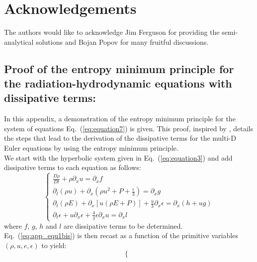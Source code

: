 \documentclass[review]{elsarticle}
\newcommand{\eqt}[1]{Eq.~(\ref{#1})}                     %
\begin{document}
\section*{Acknowledgements}
The authors would like to acknowledge Jim Ferguson for providing the semi-analytical solutions and Bojan Popov for many fruitful discussions. 
\newpage
\begin{appendices}
\section{Proof of the entropy minimum principle for the radiation-hydrodynamic equations with dissipative terms:}
\label{app:appendixA}
In this appendix, a demonstration of the entropy minimum principle for the system of equations \eqt{eq:equation7} is given. This proof, inspired by \cite{jlg}, details the steps that lead to the derivation of the dissipative terms for the multi-D Euler equations by using the entropy minimum principle.\\
We start with the hyperbolic system given in \eqt{eq:equation3} and add dissipative terms to each equation as follows:
\begin{equation}
\label{eq:app_equ1bis}
\left\{
\begin{array}{llll}
\frac{D \rho}{Dt} + \rho \partial_x u = \partial_x f \\
\partial_t (\rho u) + \partial_x \left(\rho u^2 +  P + \frac{\epsilon}{3} \right) = \partial_x g  \\
\partial_t (\rho E) + \partial_x \left[ u \left( \rho E +P \right) \right] + \frac{u}{3} \partial_x \epsilon = \partial_x \left( h + ug \right) \\
\partial_t \epsilon + u \partial_x \epsilon + \frac{4}{3} \epsilon \partial_x u = \partial_x l
\end{array}
\right.
\end{equation}
where $f$, $g$, $h$ and $l$ are dissipative terms to be determined.
\eqt{eq:app_equ1bis} is then recast as a function of the primitive variables $(\rho, u, e, \epsilon)$ to yield:
\begin{equation}
\label{eq:app_equ1}
\left\{
\begin{array}{llll}

\end{array}
\end{equation}
\end{appendices}
\end{document}
